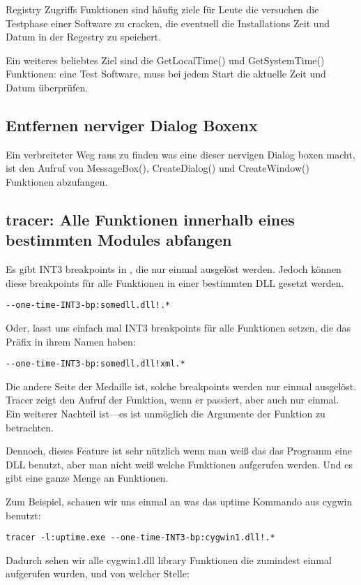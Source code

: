 Registry Zugriffs Funktionen sind häufig ziele für Leute die versuchen die Testphase einer Software zu cracken, die 
eventuell die Installations Zeit und Datum in der Regestry zu speichert. 

Ein weiteres beliebtes Ziel sind die GetLocalTime() und GetSystemTime() Funktionen:
eine Test Software, muss bei jedem Start die aktuelle Zeit und Datum überprüfen.

\subsection{Entfernen nerviger Dialog Boxenx}

Ein verbreiteter Weg raus zu finden was eine dieser nervigen Dialog boxen macht, ist den 
Aufruf von MessageBox(), CreateDialog() und CreateWindow() Funktionen abzufangen.


\subsection{tracer: Alle Funktionen innerhalb eines bestimmten Modules abfangen}


Es gibt INT3 breakpoints in \tracer, die nur einmal ausgelöst werden. Jedoch können diese breakpoints für alle 
Funktionen in einer bestimmten DLL gesetzt werden.

\begin{lstlisting}
--one-time-INT3-bp:somedll.dll!.*
\end{lstlisting}

Oder, lasst uns einfach mal INT3 breakpoints für alle Funktionen setzen, die das  Präfix in ihrem Namen haben:

\begin{lstlisting}
--one-time-INT3-bp:somedll.dll!xml.*
\end{lstlisting}

Die andere Seite der Medaille ist, solche breakpoints werden nur einmal ausgelöst.
Tracer zeigt den Aufruf der Funktion, wenn er passiert, aber auch nur einmal. 
Ein weiterer Nachteil ist---es ist unmöglich die Argumente der Funktion zu betrachten.

Dennoch, dieses Feature ist sehr nützlich wenn man weiß das das Programm eine DLL benutzt,
aber man nicht weiß welche Funktionen aufgerufen werden. Und es gibt eine ganze Menge an 
Funktionen.


\par
{}
Zum Beispiel, schauen wir uns einmal an was das uptime Kommando aus cygwin benutzt:

\begin{lstlisting}
tracer -l:uptime.exe --one-time-INT3-bp:cygwin1.dll!.*
\end{lstlisting}

Dadurch sehen wir alle cygwin1.dll library Funktionen die zumindest einmal aufgerufen wurden, und von welcher
Stelle: 



